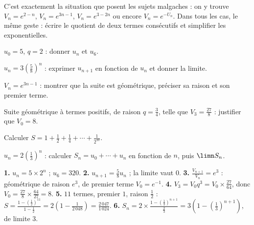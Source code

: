 \begin{remarque}
C'est exactement la situation que posent les sujets malgaches : on y trouve
$V_{n} = e^{2-n}$, $V_{n} = e^{3n-1}$, $V_{n} = e^{3-2n}$ ou encore
$V_{n} = e^{-U_{n}}$. Dans tous les cas, le même geste : écrire le quotient
de deux termes consécutifs et simplifier les exponentielles.
\end{remarque}

\begin{entrainement}
\exo[\niveau{1}] $u_{0} = 5$, $q = 2$ : donner $u_{n}$ et $u_{6}$.

\exo[\niveau{1}] $u_{n} = 3\left(\frac58\right)^{n}$ : exprimer $u_{n+1}$ en
fonction de $u_{n}$ et donner la limite.

\exo[\niveau{2}] $V_{n} = e^{3n-1}$ : montrer que la suite est géométrique,
préciser sa raison et son premier terme.

\exo[\niveau{2}] Suite géométrique à termes positifs, de raison
$q = \frac34$, telle que $V_{3} = \frac{27}{8}$ : justifier que $V_{0} = 8$.

\exo[\niveau{2}] Calculer $S = 1+\frac12+\frac14+\cdots+\frac{1}{2^{10}}$.

\exo[\niveau{3}] $u_{n} = 2\left(\frac13\right)^{n}$ : calculer
$S_{n} = u_{0}+\cdots+u_{n}$ en fonction de $n$, puis $\limn S_{n}$.
\end{entrainement}

\begin{corrige}
\textbf{1.} $u_{n} = 5\times2^{n}$ ; $u_{6} = 320$.
\textbf{2.} $u_{n+1} = \frac58u_{n}$ ; la limite vaut $0$.
\textbf{3.} $\frac{V_{n+1}}{V_{n}} = e^{3}$ : géométrique de raison
$e^{3}$, de premier terme $V_{0} = e^{-1}$.
\textbf{4.} $V_{3} = V_{0}q^{3} = V_{0}\times\frac{27}{64}$, donc
$V_{0} = \frac{27}{8}\times\frac{64}{27} = 8$.
\textbf{5.} $11$ termes, premier $1$, raison $\frac12$ :
$S = \frac{1-\left(\frac12\right)^{11}}{1-\frac12}
= 2\left(1-\frac{1}{2\,048}\right) = \frac{2\,047}{1\,024}$.
\textbf{6.} $S_{n} = 2\times\frac{1-\left(\frac13\right)^{n+1}}{\frac23}
= 3\left(1-\left(\frac13\right)^{n+1}\right)$, de limite $3$.
\end{corrige}

